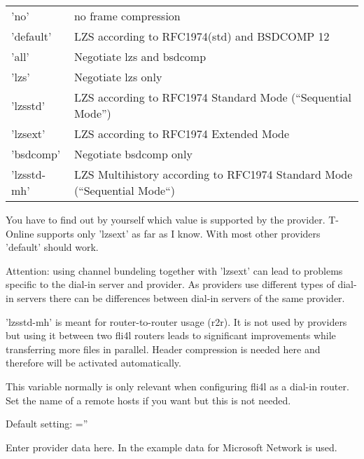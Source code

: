 \begin{description}
  \begin{tabular}[h!]{ll}
        'no' &                    no frame compression\\
        'default' &               LZS according to RFC1974(std) and
        BSDCOMP 12 \\
        'all' &                   Negotiate lzs and bsdcomp \\
        'lzs' &                   Negotiate lzs only \\
        'lzsstd' &                LZS according to RFC1974 Standard Mode
                                (``Sequential Mode'') \\
        'lzsext' &                LZS according to RFC1974 Extended Mode \\
        'bsdcomp' &               Negotiate bsdcomp only \\
        'lzsstd-mh' &             LZS Multihistory according to RFC1974
                                  Standard Mode (``Sequential Mode``)
  \end{tabular}
  
  You have to find out by yourself which value is supported by the provider. 
  T-Online supports only 'lzsext' as far as I know. With most other providers 'default' 
  should work.
  
  Attention: using channel bundeling together with 'lzsext' can lead to problems specific 
  to the dial-in server and provider. As providers use different types of dial-in servers 
  there can be differences between dial-in servers of the same provider.

  'lzsstd-mh' is meant for router-to-router usage (r2r). It is not used by providers 
  but using it between two fli4l routers leads to significant improvements while transferring 
  more files in parallel. Header compression is needed here and therefore will be activated 
  automatically.

  
  This variable normally is only relevant when configuring fli4l as a dial-in router. 
  Set the name of a remote hosts if you want but this is not needed.
  
  Default setting: =''

  
  Enter provider data here. In the example data for Microsoft Network is used.
  

\end{description}
